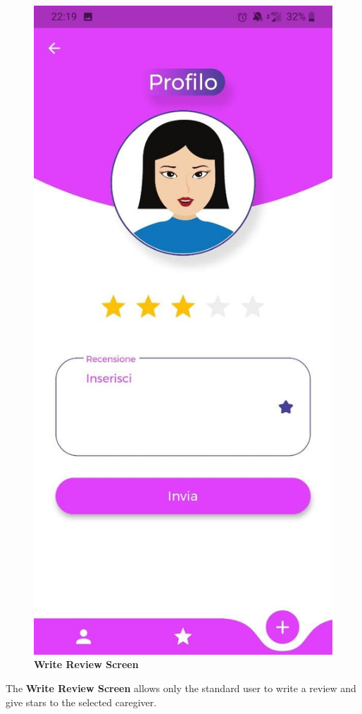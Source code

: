 \documentclass[../../dd.tex]{subfiles}
\begin{document}
    \begin{figure}[H]
        \centering
        \includegraphics[height=.6\textheight]{../../assets/screens/write_review.jpg}
        \caption{\textbf{Write Review Screen}}\label{fig:figure}
    \end{figure}
    \begin{center}
        The \textbf{Write Review Screen} allows only the standard user to write a review
        and give stars to the selected caregiver.
    \end{center}
\end{document}
